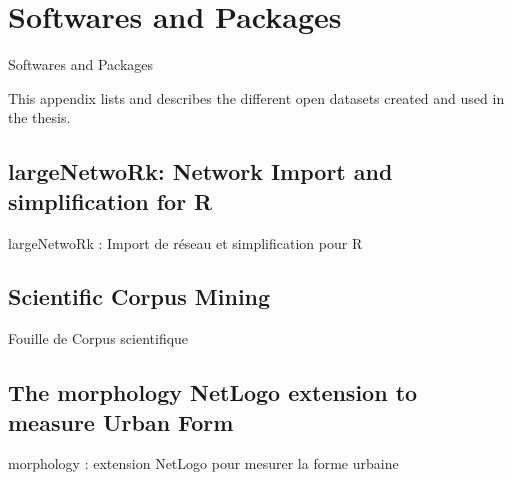 
\newpage

\section{Softwares and Packages}{Softwares and Packages} %

\label{app:packages} %



\headercit{}{}{}



This appendix lists and describes the different open datasets created and used in the thesis.



\subsection{largeNetwoRk: Network Import and simplification for R}{largeNetwoRk : Import de réseau et simplification pour R}



\subsection{Scientific Corpus Mining}{Fouille de Corpus scientifique}







\subsection{The morphology NetLogo extension to measure Urban Form}{morphology : extension NetLogo pour mesurer la forme urbaine}

\label{app:subsec:morphologyextension}



